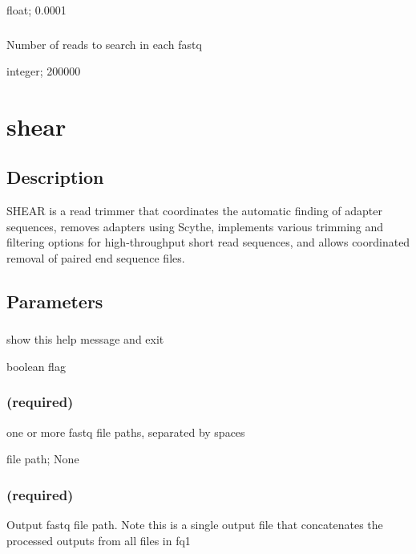\documentclass[letterpaper,11pt,english]{sphinxmanual}
\begin{document}
 float;  0.0001


\subsubsection{}
\label{\detokenize{prog_desc:n-number-of-reads}}
 Number of reads to search in each fastq

 integer;  200000


\section{shear}
\label{\detokenize{prog_desc:shear}}

\subsection{Description}
\label{\detokenize{prog_desc:id1}}
SHEAR is a read trimmer that coordinates the automatic
finding of adapter sequences, removes adapters using Scythe,
implements various trimming and filtering options
for high-throughput short read sequences, and allows coordinated
removal of paired end sequence files.


\subsection{Parameters}
\label{\detokenize{prog_desc:id2}}

\subsubsection{}
\label{\detokenize{prog_desc:id3}}
 show this help message and exit

 boolean flag


\subsubsection{ (required)}
\label{\detokenize{prog_desc:id4}}
 one or more fastq file paths, separated by spaces

 file path;  None


\subsubsection{ (required)}
\label{\detokenize{prog_desc:out1-required}}
 Output fastq file path. Note this is a single output file that concatenates the processed outputs from all files in \textendash{}fq1
\end{document}
